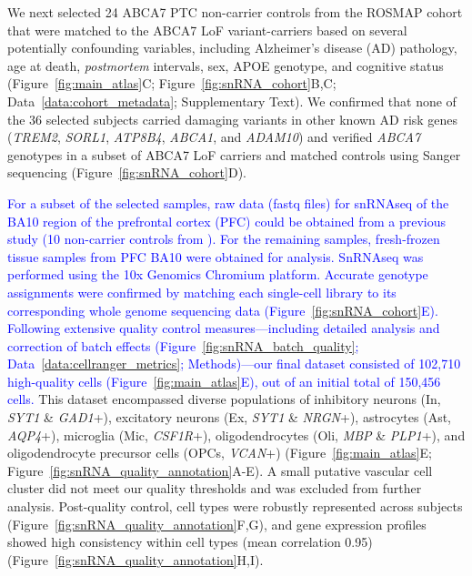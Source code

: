 \documentclass[12pt]{article}
\begin{document}
We next selected 24 ABCA7 PTC non-carrier controls from the ROSMAP cohort that were matched to the ABCA7 LoF variant-carriers based on several potentially confounding variables, including Alzheimer's disease (AD) pathology, age at death, \textit{postmortem} intervals, sex, APOE genotype, and cognitive status (Figure~\ref{fig:main_atlas}C; Figure~\ref{fig:snRNA_cohort}B,C; Data~\ref{data:cohort_metadata}; Supplementary Text). We confirmed that none of the 36 selected subjects carried damaging variants in other known AD risk genes (\textit{TREM2}, \textit{SORL1}, \textit{ATP8B4}, \textit{ABCA1}, and \textit{ADAM10}) \cite{Holstege2022-vp} and verified \textit{ABCA7} genotypes in a subset of ABCA7 LoF carriers and matched controls using Sanger sequencing (Figure~\ref{fig:snRNA_cohort}D).

\newcommand{\quoteE}{\textcolor{blue}{For a subset of the selected samples, raw data (fastq files) for snRNAseq of the BA10 region of the prefrontal cortex (PFC) could be obtained from a previous study (10 non-carrier controls from \cite{Mathys2019-wb}). For the remaining samples, fresh-frozen tissue samples from PFC BA10 were obtained for analysis. SnRNAseq was performed using the 10x Genomics Chromium platform. Accurate genotype assignments were confirmed by matching each single-cell library to its corresponding whole genome sequencing data (Figure~\ref{fig:snRNA_cohort}E). Following extensive quality control measures—including detailed analysis and correction of batch effects (Figure~\ref{fig:snRNA_batch_quality}; Data~\ref{data:cellranger_metrics}; Methods)—our final dataset consisted of 102,710 high-quality cells (Figure~\ref{fig:main_atlas}E), out of an initial total of 150,456 cells. \label{quoteE-label}}}
\quoteE This dataset encompassed diverse populations of inhibitory neurons (In, \textit{SYT1} \& \textit{GAD1}+), excitatory neurons (Ex, \textit{SYT1} \& \textit{NRGN}+), astrocytes (Ast, \textit{AQP4}+), microglia (Mic, \textit{CSF1R}+), oligodendrocytes (Oli, \textit{MBP} \& \textit{PLP1}+), and oligodendrocyte precursor cells (OPCs, \textit{VCAN}+) (Figure~\ref{fig:main_atlas}E; Figure~\ref{fig:snRNA_quality_annotation}A-E). A small putative vascular cell cluster did not meet our quality thresholds and was excluded from further analysis. Post-quality control, cell types were robustly represented across subjects (Figure~\ref{fig:snRNA_quality_annotation}F,G), and gene expression profiles showed high consistency within cell types (mean correlation 0.95) (Figure~\ref{fig:snRNA_quality_annotation}H,I).
\end{document}
